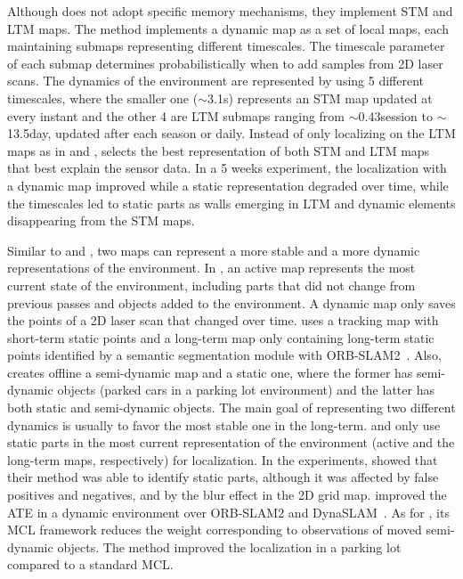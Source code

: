 Although \cite{biber-duckett:2009:0278364908096286} does not adopt specific memory mechanisms, they implement STM and LTM maps. The method implements a dynamic map as a set of local maps, each maintaining submaps representing different timescales. The timescale parameter of each submap determines probabilistically when to add samples from 2D laser scans.
The dynamics of the environment are represented by using 5 different timescales, where the smaller one ($\sim$3.1s) represents an STM map updated at every instant and the other 4 are LTM submaps ranging from $\sim$0.43session to $\sim$13.5day, updated after each season or daily. Instead of only localizing on the LTM maps as in\cite{dayoub-et-al:2011:013} and \cite{bacca-et-al:2013:003}, \cite{biber-duckett:2009:0278364908096286} selects the best representation of both STM and LTM maps that best explain the sensor data.
In a 5 weeks experiment, the localization with a dynamic map improved while a static representation degraded over time, while the timescales led to static parts as walls emerging in LTM and dynamic elements disappearing from the STM maps.

Similar to \cite{dayoub-et-al:2011:013} and \cite{bacca-et-al:2013:003}, two maps can represent a more stable and a more dynamic representations of the environment.
In \cite{walcott-bryant-et-al:2012:6385561}, an active map represents the most current state of the environment, including parts that did not change from previous passes and objects added to the environment. A dynamic map only saves the points of a 2D laser scan that changed over time.
\cite{wang-et-al:2019:8793499} uses a tracking map with short-term static points and a long-term map only containing long-term static points identified by a semantic segmentation module with ORB-SLAM2~\parencite{discussion:orb-slam2}.
Also, \cite{zhu-et-al:2021:9561584} creates offline a semi-dynamic map and a static one, where the former has semi-dynamic objects (parked cars in a parking lot environment) and the latter has both static and semi-dynamic objects.
The main goal of representing two different dynamics is usually to favor the most stable one in the long-term.
\cite{walcott-bryant-et-al:2012:6385561} and \cite{wang-et-al:2019:8793499} only use static parts in the most current representation of the environment (active and the long-term maps, respectively) for localization.
In the experiments, \cite{walcott-bryant-et-al:2012:6385561} showed that their method was able to identify static parts, although it was affected by false positives and negatives, and by the blur effect in the 2D grid map.
\cite{wang-et-al:2019:8793499} improved the ATE in a dynamic environment over ORB-SLAM2 and DynaSLAM~\parencite{bescos-et-al:2018:2860039}.
As for \cite{zhu-et-al:2021:9561584}, its MCL framework reduces the weight corresponding to observations of moved semi-dynamic objects. The method improved the localization in a parking lot compared to a standard MCL.



